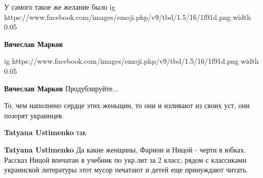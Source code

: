 \begin{itemize}
 
У самого такое же желание было 
\ifcmt
  ig https://www.facebook.com/images/emoji.php/v9/tbd/1.5/16/1f91d.png
  width 0.05
\fi

\begin{itemize}
 
\textbf{Вячеслав Марков} 

\ifcmt
  ig https://www.facebook.com/images/emoji.php/v9/tbd/1.5/16/1f91d.png
  width 0.05
\fi


 
\textbf{Вячеслав Марков}
Продублируйте...
\end{itemize}

 
То, чем наполнено сердце этих женьщин, то они и изливают из своих уст, они позорят украинцев.


\begin{itemize}
 
\textbf{Tatyana Ustimenko} так

 
\textbf{Tatyana Ustimenko} Да какие женщины, Фарион и Ницой - черти в юбках.
Рассказ Ницой впечатан в учебник по укр.лит за 2 класс, рядом с классиками
украинской литературы этот мусор печатают и детей еще принуждают читать.
\end{itemize}


\end{itemize}
